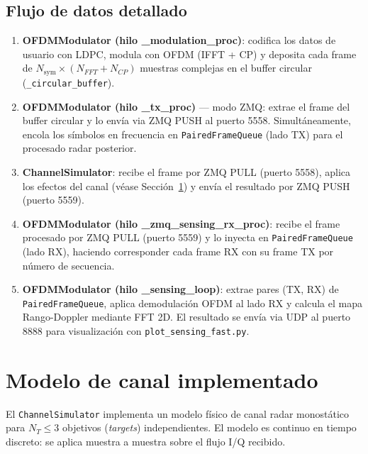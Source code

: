 \documentclass[11pt,a4paper]{article}
\begin{document}
\subsection{Flujo de datos detallado}

\begin{enumerate}
  \item \textbf{OFDMModulator (hilo \_modulation\_proc)}:
        codifica los datos de usuario con LDPC, modula con OFDM (IFFT + CP) y deposita
        cada frame de $N_\text{sym} \times (N_{FFT} + N_{CP})$ muestras complejas en
        el buffer circular (\texttt{\_circular\_buffer}).

  \item \textbf{OFDMModulator (hilo \_tx\_proc)} — modo ZMQ:
        extrae el frame del buffer circular y lo envía via ZMQ PUSH al puerto 5558.
        Simultáneamente, encola los símbolos en frecuencia en \texttt{PairedFrameQueue}
        (lado TX) para el procesado radar posterior.

  \item \textbf{ChannelSimulator}:
        recibe el frame por ZMQ PULL (puerto 5558), aplica los efectos del canal
        (véase Sección~\ref{sec:canal}) y envía el resultado por ZMQ PUSH (puerto 5559).

  \item \textbf{OFDMModulator (hilo \_zmq\_sensing\_rx\_proc)}:
        recibe el frame procesado por ZMQ PULL (puerto 5559) y lo inyecta en
        \texttt{PairedFrameQueue} (lado RX), haciendo corresponder cada frame RX
        con su frame TX por número de secuencia.

  \item \textbf{OFDMModulator (hilo \_sensing\_loop)}:
        extrae pares (TX, RX) de \texttt{PairedFrameQueue}, aplica demodulación OFDM
        al lado RX y calcula el mapa Rango-Doppler mediante FFT 2D. El resultado
        se envía via UDP al puerto 8888 para visualización con \texttt{plot\_sensing\_fast.py}.
\end{enumerate}

\section{Modelo de canal implementado}
\label{sec:canal}

El \texttt{ChannelSimulator} implementa un modelo físico de canal radar monostático
para $N_T \leq 3$ objetivos (\textit{targets}) independientes. El modelo es continuo
en tiempo discreto: se aplica muestra a muestra sobre el flujo I/Q recibido.
\end{document}
